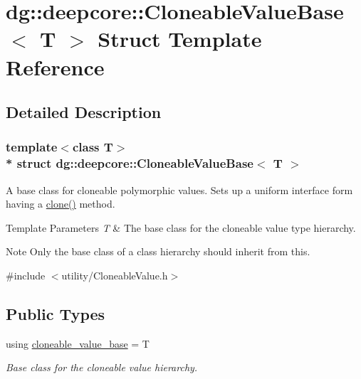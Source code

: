 \hypertarget{structdg_1_1deepcore_1_1_cloneable_value_base}{}\section{dg\+:\+:deepcore\+:\+:Cloneable\+Value\+Base$<$ T $>$ Struct Template Reference}
\label{structdg_1_1deepcore_1_1_cloneable_value_base}


\subsection{Detailed Description}
\subsubsection*{template$<$class T$>$\\*
struct dg\+::deepcore\+::\+Cloneable\+Value\+Base$<$ T $>$}

A base class for cloneable polymorphic values. Sets up a uniform interface form having a {\ttfamily \hyperlink{structdg_1_1deepcore_1_1_cloneable_value_base_afa66af64c1335e01931f7919f0033730}{clone()}} method. 


\begin{DoxyTemplParams}{Template Parameters}
{\em T} & The base class for the cloneable value type hierarchy.\\
\hline
\end{DoxyTemplParams}
\begin{DoxyNote}{Note}
Only the base class of a class hierarchy should inherit from this. 
\end{DoxyNote}


{\ttfamily \#include $<$utility/\+Cloneable\+Value.\+h$>$}

\subsection*{Public Types}
\begin{DoxyCompactItemize}
\item 
using \hyperlink{structdg_1_1deepcore_1_1_cloneable_value_base_ad3c830a285f1c7c068fad7d7f10e128e}{cloneable\+\_\+value\+\_\+base} = T
\begin{DoxyCompactList}\small\item\em Base class for the cloneable value hierarchy. \end{DoxyCompactList}\end{DoxyCompactItemize}

